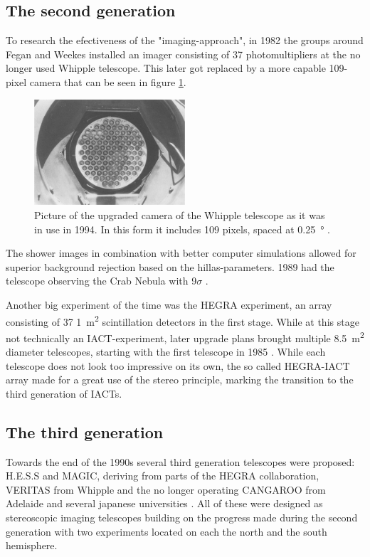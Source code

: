 \subsection{The second generation}
To research the efectiveness of the "imaging-approach", in 1982 the groups around Fegan and Weekes
installed an imager consisting of 37 photomultipliers at the no longer used Whipple telescope.
This later got replaced by a more capable 109-pixel camera that can be seen in figure \ref{fig:whipple_cam}.

\begin{figure}
	\centering
    \includegraphics[width=0.5\textwidth]{images/whipple_cam.png}
    \caption{
		Picture of the upgraded camera of the Whipple telescope as it was in use in 1994.
		In this form it includes 109 pixels, spaced at \SI{0.25}{\degree} \cite{Cawley1995}.}  %
    \label{fig:whipple_cam}
\end{figure}

The shower images in combination with better computer simulations allowed for 
superior background rejection based on the  hillas-parameters.
1989 had the telescope observing the Crab Nebula with 9$\sigma$ 
\cite{1989ApJ...342..379W}.


Another big experiment of the time was the HEGRA experiment, an array consisting 
of 37 \SI{1}{\meter^2} scintillation detectors \cite{ALLKOFER1990345} in the first stage.
While at this stage not technically an IACT-experiment, later upgrade plans
brought multiple \SI{8.5}{\meter^2} diameter telescopes, starting with the first 
telescope in 1985 \cite{DAUM19971}.
While each telescope does not look too impressive on its own,
the so called HEGRA-IACT array made for a great use of the stereo principle,
marking the transition to the third generation of IACTs.


\subsection{The third generation}

Towards the end of the 1990s several third generation telescopes were
proposed:
H.E.S.S and MAGIC, deriving from parts of the HEGRA collaboration, 
VERITAS from Whipple and the no longer operating CANGAROO from Adelaide and 
several japanese universities \cite{HILLAS201319}.
All of these were designed as stereoscopic imaging telescopes building on the progress made during the 
second generation with two experiments located on each the north and the south hemisphere.

